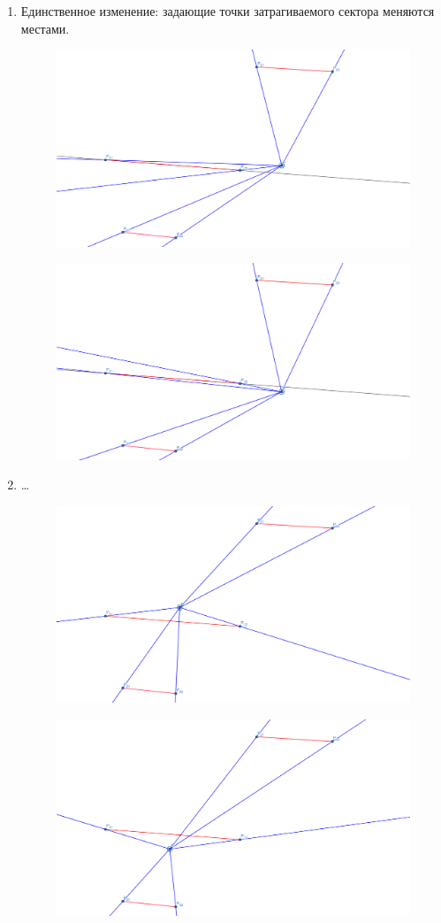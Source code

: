 \documentclass[letterpaper,12pt]{article}
\begin{document}
\begin{enumerate}
      \item Единственное изменение: задающие точки затрагиваемого сектора
            меняются местами.
            \par
            \begin{figure}[h]
            \centering
            \includegraphics[width=0.5\linewidth]{near_segment_1.png}
            \end{figure}
            \begin{figure}[h]
            \centering
            \includegraphics[width=0.5\linewidth]{near_segment_2.png}
            \end{figure}
      \item \dots
            \begin{figure}[H]
            \centering
            \includegraphics[width=0.5\linewidth]{segment_1.png}
            \end{figure}
            \begin{figure}[H]
            \centering
            \includegraphics[width=0.5\linewidth]{segment_2.png}

\end{figure}
\end{enumerate}
\end{document}
